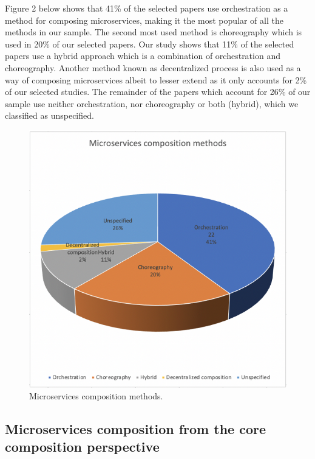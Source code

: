 \documentclass{article}
\begin{document}
\begin{multicols}{2}
Figure 2 below shows that 41\% of the selected papers use orchestration as a method for composing microservices, making it the most popular of all the methods in our sample. The second most used method is choreography which is used in 20\% of our selected papers. Our study shows that 11\% of the selected papers use a hybrid approach which is a combination of orchestration and choreography. Another method known as decentralized process is also used as a way of composing microservices albeit to lesser extend as it only accounts for 2\% of our selected studies. The remainder of the papers which account for 26\% of our sample use neither orchestration, nor choreography or both (hybrid), which we classified as unspecified.

\begin{figure}[htbp]
 \centerline{\includegraphics[scale=0.60]{mscompcore.png}}
  \caption{Microservices composition methods.}
  \label{fig}
\end{figure}


\subsection{Microservices composition from the core composition perspective}



\end{multicols}
\end{document}
